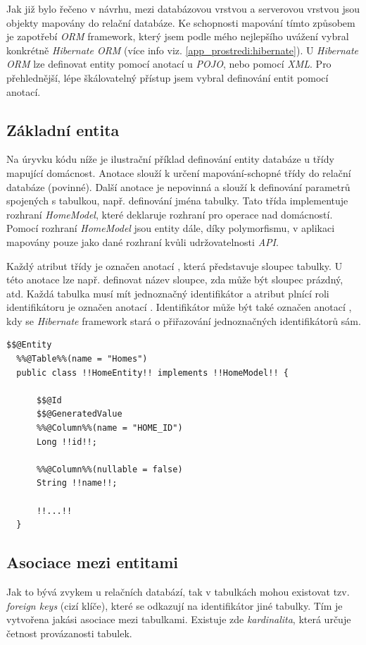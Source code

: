 Jak již bylo řečeno v návrhu, mezi databázovou vrstvou a serverovou vrstvou jsou objekty mapovány do relační databáze.
Ke schopnosti mapování tímto způsobem je zapotřebí \emph{ORM} framework, který jsem podle mého nejlepšího uvážení vybral konkrétně \emph{Hibernate ORM} (více info viz. \ref{app_prostredi:hibernate}).
U \emph{Hibernate ORM} lze definovat entity pomocí anotací u \emph{POJO}, nebo pomocí \emph{XML}.
Pro přehlednější, lépe škálovatelný přístup jsem vybral definování entit pomocí anotací.

\subsection*{Základní entita}

Na úryvku kódu níže je ilustrační příklad definování entity databáze u třídy mapující domácnost.
Anotace  slouží k určení mapování-schopné třídy do relační databáze (povinné).
Další anotace  je nepovinná a slouží k definování parametrů spojených s tabulkou, např. definování jména tabulky.
Tato třída implementuje rozhraní \emph{HomeModel}, které deklaruje rozhraní pro operace nad domácností.
Pomocí rozhraní \emph{HomeModel} jsou entity dále, díky polymorfismu, v aplikaci mapovány pouze jako dané rozhraní kvůli udržovatelnosti \emph{API}.

Každý atribut třídy je označen anotací , která představuje sloupec tabulky.
U této anotace lze např. definovat název sloupce, zda může být sloupec prázdný, atd.
Každá tabulka musí mít jednoznačný identifikátor a atribut plnící roli identifikátoru je označen anotací .
Identifikátor může být také označen anotací , kdy se \emph{Hibernate} framework stará o přiřazování jednoznačných identifikátorů sám.

\begin{lstlisting}[style=JavaStyle, caption={Ukázka definování entity}]
  $$@Entity
  %%@Table%%(name = "Homes")
  public class !!HomeEntity!! implements !!HomeModel!! {
  
      $$@Id
      $$@GeneratedValue
      %%@Column%%(name = "HOME_ID")
      Long !!id!!;
  
      %%@Column%%(nullable = false)
      String !!name!!;

      !!...!!
  }
\end{lstlisting}

\newpage
\subsection*{Asociace mezi entitami}
Jak to bývá zvykem u relačních databází, tak v tabulkách mohou existovat tzv. \emph{foreign keys} (cizí klíče), které se odkazují na identifikátor jiné tabulky.
Tím je vytvořena jakási asociace mezi tabulkami.
Existuje zde \emph{kardinalita}, která určuje četnost provázanosti tabulek.


